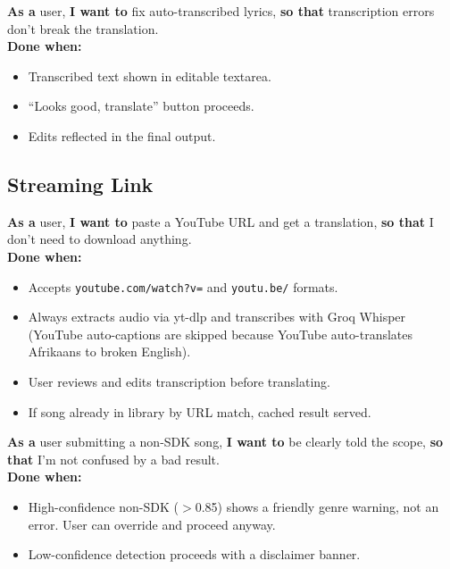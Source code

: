 \documentclass[12pt, a4paper]{article}
\begin{document}
\begin{tcolorbox}[storybox, title={US-04 — Edit Transcription Before Translating}]
  \textbf{As a} user, \textbf{I want to} fix auto-transcribed lyrics,
  \textbf{so that} transcription errors don't break the translation.\\[0.4em]
  \textbf{Done when:}
  \begin{itemize}
    \item Transcribed text shown in editable textarea.
    \item ``Looks good, translate'' button proceeds.
    \item Edits reflected in the final output.
  \end{itemize}
\end{tcolorbox}

\subsection{Streaming Link}

\begin{tcolorbox}[storybox, title={US-05 — Translate via YouTube Link}]
  \textbf{As a} user, \textbf{I want to} paste a YouTube URL and get a
  translation, \textbf{so that} I don't need to download anything.\\[0.4em]
  \textbf{Done when:}
  \begin{itemize}
    \item Accepts \texttt{youtube.com/watch?v=} and \texttt{youtu.be/} formats.
    \item Always extracts audio via yt-dlp and transcribes with Groq Whisper
          (YouTube auto-captions are skipped because YouTube auto-translates
          Afrikaans to broken English).
    \item User reviews and edits transcription before translating.
    \item If song already in library by URL match, cached result served.
  \end{itemize}
\end{tcolorbox}

\begin{tcolorbox}[storybox, title={US-06 — Reject Non-SDK Content}]
  \textbf{As a} user submitting a non-SDK song, \textbf{I want to} be
  clearly told the scope, \textbf{so that} I'm not confused by a bad result.\\[0.4em]
  \textbf{Done when:}
  \begin{itemize}
    \item High-confidence non-SDK ($>$0.85) shows a friendly genre warning,
          not an error. User can override and proceed anyway.
    \item Low-confidence detection proceeds with a disclaimer banner.
  \end{itemize}
\end{tcolorbox}
\end{document}
